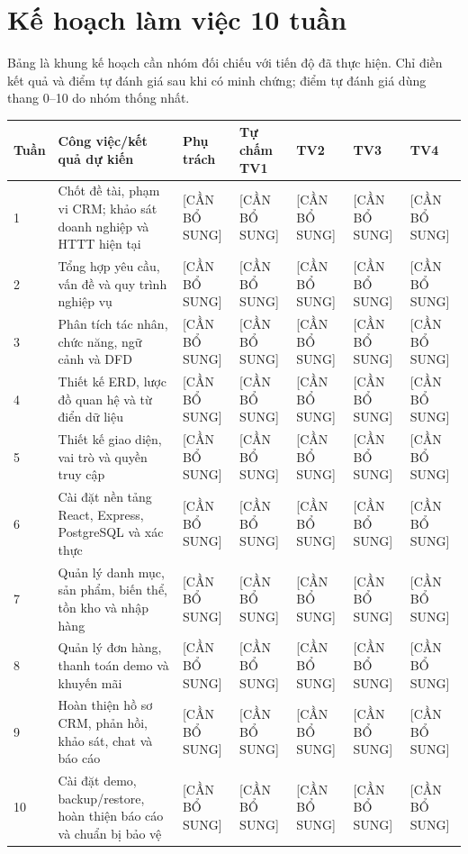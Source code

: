 \chapter*{Kế hoạch làm việc 10 tuần}
Bảng là khung kế hoạch cần nhóm đối chiếu với tiến độ đã thực hiện. Chỉ điền kết quả và điểm tự đánh giá sau khi có minh chứng; điểm tự đánh giá dùng thang 0--10 do nhóm thống nhất.
\scriptsize
\setlength{\tabcolsep}{1.5pt}
\begin{longtable}{|p{}|p{}|p{}|p{}|p{}|p{}|p{}|}\hline
\textbf{Tuần}&\textbf{Công việc/kết quả dự kiến}&\textbf{Phụ trách}&\textbf{Tự chấm TV1}&\textbf{TV2}&\textbf{TV3}&\textbf{TV4}\\\hline\endhead
1&Chốt đề tài, phạm vi CRM; khảo sát doanh nghiệp và HTTT hiện tại&[CẦN BỔ SUNG]&[CẦN BỔ SUNG]&[CẦN BỔ SUNG]&[CẦN BỔ SUNG]&[CẦN BỔ SUNG]\\\hline
2&Tổng hợp yêu cầu, vấn đề và quy trình nghiệp vụ&[CẦN BỔ SUNG]&[CẦN BỔ SUNG]&[CẦN BỔ SUNG]&[CẦN BỔ SUNG]&[CẦN BỔ SUNG]\\\hline
3&Phân tích tác nhân, chức năng, ngữ cảnh và DFD&[CẦN BỔ SUNG]&[CẦN BỔ SUNG]&[CẦN BỔ SUNG]&[CẦN BỔ SUNG]&[CẦN BỔ SUNG]\\\hline
4&Thiết kế ERD, lược đồ quan hệ và từ điển dữ liệu&[CẦN BỔ SUNG]&[CẦN BỔ SUNG]&[CẦN BỔ SUNG]&[CẦN BỔ SUNG]&[CẦN BỔ SUNG]\\\hline
5&Thiết kế giao diện, vai trò và quyền truy cập&[CẦN BỔ SUNG]&[CẦN BỔ SUNG]&[CẦN BỔ SUNG]&[CẦN BỔ SUNG]&[CẦN BỔ SUNG]\\\hline
6&Cài đặt nền tảng React, Express, PostgreSQL và xác thực&[CẦN BỔ SUNG]&[CẦN BỔ SUNG]&[CẦN BỔ SUNG]&[CẦN BỔ SUNG]&[CẦN BỔ SUNG]\\\hline
7&Quản lý danh mục, sản phẩm, biến thể, tồn kho và nhập hàng&[CẦN BỔ SUNG]&[CẦN BỔ SUNG]&[CẦN BỔ SUNG]&[CẦN BỔ SUNG]&[CẦN BỔ SUNG]\\\hline
8&Quản lý đơn hàng, thanh toán demo và khuyến mãi&[CẦN BỔ SUNG]&[CẦN BỔ SUNG]&[CẦN BỔ SUNG]&[CẦN BỔ SUNG]&[CẦN BỔ SUNG]\\\hline
9&Hoàn thiện hồ sơ CRM, phản hồi, khảo sát, chat và báo cáo&[CẦN BỔ SUNG]&[CẦN BỔ SUNG]&[CẦN BỔ SUNG]&[CẦN BỔ SUNG]&[CẦN BỔ SUNG]\\\hline
10&Cài đặt demo, backup/restore, hoàn thiện báo cáo và chuẩn bị bảo vệ&[CẦN BỔ SUNG]&[CẦN BỔ SUNG]&[CẦN BỔ SUNG]&[CẦN BỔ SUNG]&[CẦN BỔ SUNG]\\\hline
\end{longtable}
\normalsize
\setlength{\tabcolsep}{6pt}

